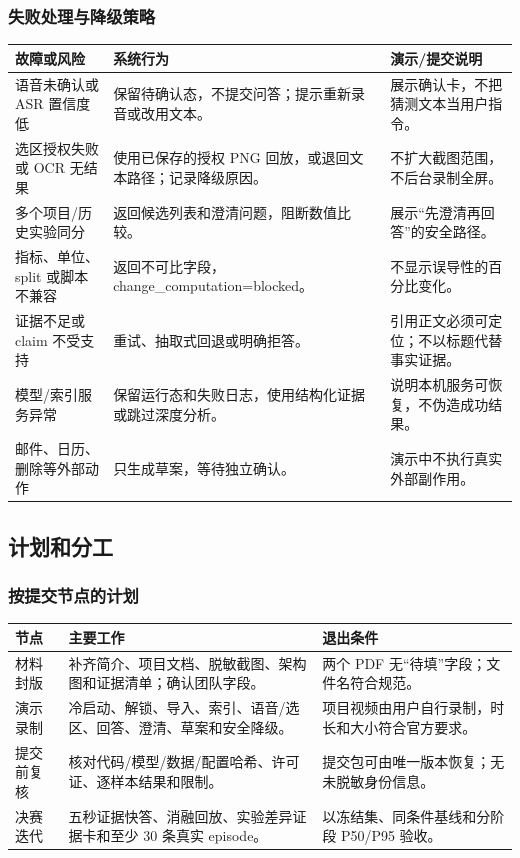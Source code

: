 \documentclass[UTF8,12pt]{ctexart}
\begin{document}
\subsubsection{失败处理与降级策略}
\begin{center}
\small
\begin{tabularx}{\textwidth}{>{\raggedright\arraybackslash}p{}
  >{\raggedright\arraybackslash}p{}X}
\toprule
故障或风险 & 系统行为 & 演示/提交说明\\
\midrule
语音未确认或 ASR 置信度低 & 保留待确认态，不提交问答；提示重新录音或改用文本。 & 展示确认卡，不把猜测文本当用户指令。\\
选区授权失败或 OCR 无结果 & 使用已保存的授权 PNG 回放，或退回文本路径；记录降级原因。 & 不扩大截图范围，不后台录制全屏。\\
多个项目/历史实验同分 & 返回候选列表和澄清问题，阻断数值比较。 & 展示“先澄清再回答”的安全路径。\\
指标、单位、split 或脚本不兼容 & 返回不可比字段，change\_computation=blocked。 & 不显示误导性的百分比变化。\\
证据不足或 claim 不受支持 & 重试、抽取式回退或明确拒答。 & 引用正文必须可定位；不以标题代替事实证据。\\
模型/索引服务异常 & 保留运行态和失败日志，使用结构化证据或跳过深度分析。 & 说明本机服务可恢复，不伪造成功结果。\\
邮件、日历、删除等外部动作 & 只生成草案，等待独立确认。 & 演示中不执行真实外部副作用。\\
\bottomrule
\end{tabularx}
\end{center}

\subsection{计划和分工}

\subsubsection{按提交节点的计划}
\begin{center}
\small
\begin{tabularx}{\textwidth}{>{\raggedright\arraybackslash}p{}
  >{\raggedright\arraybackslash}p{}X}
\toprule
节点 & 主要工作 & 退出条件\\
\midrule
材料封版 & 补齐简介、项目文档、脱敏截图、架构图和证据清单；确认团队字段。 & 两个 PDF 无“待填”字段；文件名符合规范。\\
演示录制 & 冷启动、解锁、导入、索引、语音/选区、回答、澄清、草案和安全降级。 & 项目视频由用户自行录制，时长和大小符合官方要求。\\
提交前复核 & 核对代码/模型/数据/配置哈希、许可证、逐样本结果和限制。 & 提交包可由唯一版本恢复；无未脱敏身份信息。\\
决赛迭代 & 五秒证据快答、消融回放、实验差异证据卡和至少 30 条真实 episode。 & 以冻结集、同条件基线和分阶段 P50/P95 验收。\\
\bottomrule
\end{tabularx}
\end{center}
\end{document}
